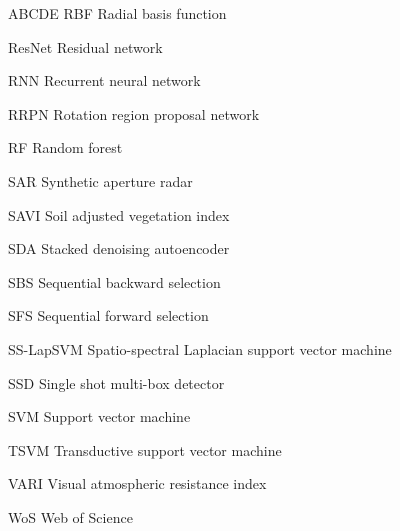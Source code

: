 \begin{seznamzkratek}{ABCDE}
	      {RBF}
	      {Radial basis function}

	      {ResNet}
	      {Residual network}

	      {RNN}
	      {Recurrent neural network}

	      {RRPN}
	      {Rotation region proposal network}

	      {RF}
	      {Random forest}

	      {SAR}
	      {Synthetic aperture radar}

	      {SAVI}
	      {Soil adjusted vegetation index}

	      {SDA}
	      {Stacked denoising autoencoder}

	      {SBS}
	      {Sequential backward selection}

	      {SFS}
	      {Sequential forward selection}

	      {SS-LapSVM}
	      {Spatio-spectral Laplacian support vector machine}

	      {SSD}
	      {Single shot multi-box detector}

	      {SVM}
	      {Support vector machine}

	      {TSVM}
	      {Transductive support vector machine}

	      {VARI}
	      {Visual atmospheric resistance index}

	      {WoS}
	      {Web of Science}
	      
\end{seznamzkratek}